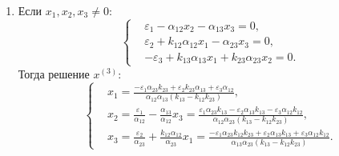 \begin{enumerate}

        \item Если \( x_1, x_2, x_3 \neq 0 \):
            \[
                \left\{\begin{split}
                    & \varepsilon_1 - \alpha_{12} x_2 - \alpha_{13} x_3 = 0, \\
                    & \varepsilon_2 + k_{12} \alpha_{12} x_1 - \alpha_{23} x_3 = 0, \\
                    & -\varepsilon_3 + k_{13} \alpha_{13} x_1 + k_{23} \alpha_{23} x_2 = 0. 
                \end{split}\right.
            \]
            Тогда решение \( x^{(3)} \):
            \[
                \left\{\begin{split}
                    & x_1 = \frac{-\varepsilon_1 \alpha_{23} k_{23} + \varepsilon_2 k_{23} \alpha_{13} + \varepsilon_3 \alpha_{12}}{\alpha_{12} \alpha_{13} (k_{13} - k_{12} k_{23})}, \\
                    & x_2 = \frac{\varepsilon_1}{\alpha_{12}} - \frac{\alpha_{13}}{\alpha_{12}} x_3
                    = \frac{\varepsilon_1 \alpha_{23} k_{13} - \varepsilon_2 \alpha_{13} k_{13} - \varepsilon_3 \alpha_{12} k_{12}}{\alpha_{12} \alpha_{23} (k_{13} - k_{12} k_{23})}, \\ 
                    & x_3 = \frac{\varepsilon_2}{\alpha_{23}} + \frac{k_{12} \alpha_{12}}{\alpha_{23}} x_1
                    = \frac{-\varepsilon_1 \alpha_{23} k_{12} k_{23} + \varepsilon_2 \alpha_{13} k_{13} + \varepsilon_3 \alpha_{12} k_{12}}{\alpha_{13} \alpha_{23} (k_{13} - k_{12} k_{23})}.
                \end{split}\right.
            \]


\end{enumerate}
